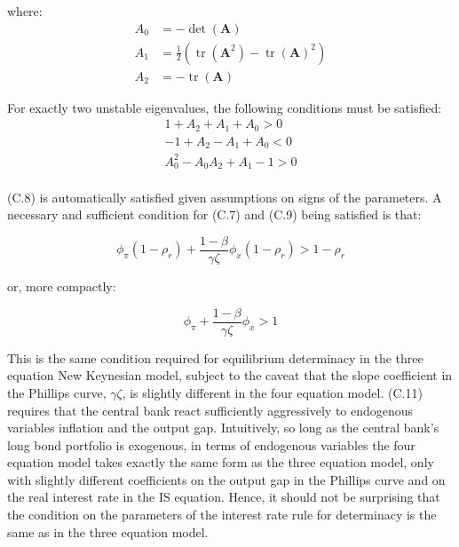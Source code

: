 \documentclass[10pt]{article}
\begin{document}
where:\\
\begin{align*}
A_{0} & =-\operatorname{det}(\mathbf{A})  \tag{C.4}\\
A_{1} & =\frac{1}{2}\left(\operatorname{tr}\left(\mathbf{A}^{2}\right)-\operatorname{tr}(\mathbf{A})^{2}\right)  \tag{C.5}\\
A_{2} & =-\operatorname{tr}(\mathbf{A}) \tag{C.6}
\end{align*}

For exactly two unstable eigenvalues, the following conditions must be satisfied:\\
\[
\begin{array}{r}
1+A_{2}+A_{1}+A_{0}>0 \\
-1+A_{2}-A_{1}+A_{0}<0 \\
A_{0}^{2}-A_{0} A_{2}+A_{1}-1>0 \tag{C.9}
\end{array}
\]\\
(C.8) is automatically satisfied given assumptions on signs of the parameters. A necessary and sufficient condition for (C.7) and (C.9) being satisfied is that:

\begin{equation*}
\phi_{\pi}\left(1-\rho_{r}\right)+\frac{1-\beta}{\gamma \zeta} \phi_{x}\left(1-\rho_{r}\right)>1-\rho_{r} \tag{C.10}
\end{equation*}

or, more compactly:

\begin{equation*}
\phi_{\pi}+\frac{1-\beta}{\gamma \zeta} \phi_{x}>1 \tag{C.11}
\end{equation*}

This is the same condition required for equilibrium determinacy in the three equation New Keynesian model, subject to the caveat that the slope coefficient in the Phillips curve, $\gamma \zeta$, is slightly different in the four equation model. (C.11) requires that the central bank react sufficiently aggressively to endogenous variables inflation and the output gap. Intuitively, so long as the central bank's long bond portfolio is exogenous, in terms of endogenous variables the four equation model takes exactly the same form as the three equation model, only with slightly different coefficients on the output gap in the Phillips curve and on the real interest rate in the IS equation. Hence, it should not be surprising that the condition on the parameters of the interest rate rule for determinacy is the same as in the three equation model.
\end{document}
